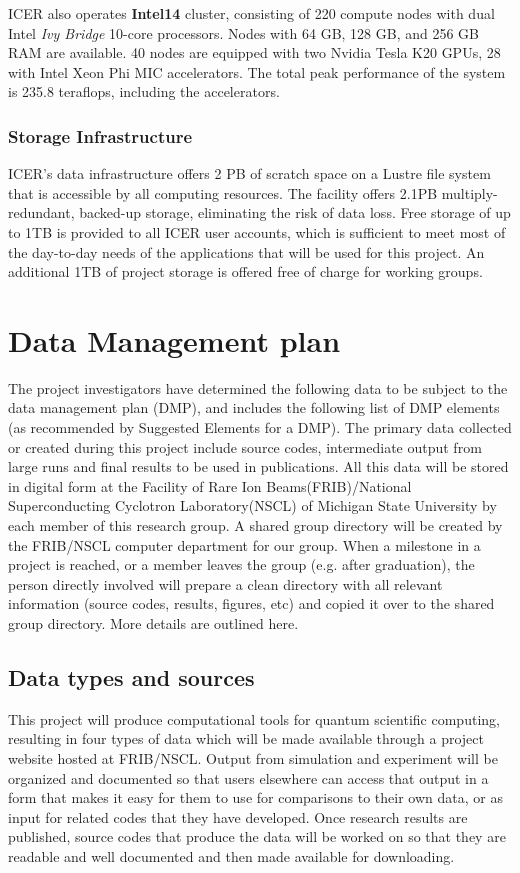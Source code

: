 \documentclass[10pt]{article}
\begin{document}
ICER also operates \textbf{Intel14} cluster, consisting of 220 compute nodes
with dual Intel \emph{Ivy Bridge} 10-core processors. Nodes with 64 GB, 128 GB,
and 256 GB RAM are available. 40 nodes are equipped with two Nvidia Tesla K20
GPUs, 28 with Intel Xeon Phi MIC accelerators. The total peak performance of
the system is 235.8 teraflops, including the accelerators.

\subsubsection{Storage Infrastructure}
ICER's data infrastructure offers 2 PB of scratch space on a Lustre
file system that is accessible by all computing resources. The facility offers
2.1PB multiply-redundant, backed-up storage, eliminating the risk of data loss.
Free storage of up to 1TB is provided to all ICER user accounts, which is
sufficient to meet most of the day-to-day needs of the applications that
will be used for this project. An additional 1TB of project storage
is offered free of charge for working groups.





\section{Data Management plan}
The project investigators  have determined the following data to be subject to the data management plan
(DMP), and includes the following list of DMP elements (as recommended by Suggested Elements
for a DMP).
The primary data collected or created during this project include source codes, intermediate output from large runs and final results to
be used in publications. All this data will be stored in digital form
at the Facility of Rare Ion Beams(FRIB)/National Superconducting
Cyclotron Laboratory(NSCL) of Michigan State University by each member of this research group.  A shared
group directory will be created by the FRIB/NSCL computer department for
our group. When a milestone in a project is reached, or a member
leaves the group (e.g. after graduation), the person directly involved
will prepare a clean directory with all relevant information (source
codes, results, figures, etc) and copied it over to the shared group
directory. More details are outlined here.
 



\subsection{Data types and sources}
This project will produce computational tools for quantum scientific computing, resulting in four
types of data which will be made available through a project website hosted at FRIB/NSCL. Output from
simulation and experiment will be organized and documented so that users elsewhere can access
that output in a form that makes it easy for them to use for comparisons to their own data, or as
input for related codes that they have developed. Once research results are published, source codes
that produce the data will be worked on so that they are readable and well documented and then
made available for downloading.
\end{document}
